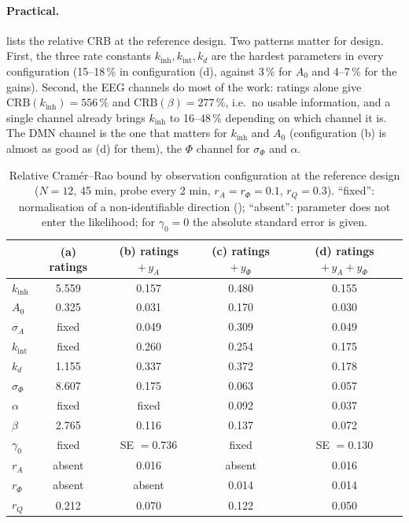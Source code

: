\documentclass[12pt,a4paper]{article}
\theoremstyle{plain}
\theoremstyle{definition}
\theoremstyle{remark}
\newcommand{\kinh}{k_{\mathrm{inh}}}
\newcommand{\kint}{k_{\mathrm{int}}}
\newcommand{\kd}{k_{d}}
\newcommand{\sA}{\sigma_{A}}
\newcommand{\sPhi}{\sigma_{\Phi}}
\newcommand{\rA}{r_{A}}
\newcommand{\rPhi}{r_{\Phi}}
\newcommand{\rQ}{r_{Q}}
\newcommand{\CRB}{\mathrm{CRB}}
\begin{document}
\paragraph{Practical.}  lists the relative CRB at the reference design. Two patterns matter for design. First, the three rate constants $\kinh,\kint,\kd$ are the hardest parameters in every configuration (15--18\,\% in configuration (d), against 3\,\% for $A_0$ and 4--7\,\% for the gains). Second, the EEG channels do most of the work: ratings alone give $\CRB(\kinh)=556\,\%$ and $\CRB(\beta)=277\,\%$, i.e.\ no usable information, and a single channel already brings $\kinh$ to 16--48\,\% depending on which channel it is. The DMN channel is the one that matters for $\kinh$ and $A_0$ (configuration (b) is almost as good as (d) for them), the $\Phi$ channel for $\sPhi$ and $\alpha$.

\begin{table}[t]
\centering\small
\caption{Relative Cram\'er--Rao bound by observation configuration at the reference design ($N=12$, 45 min, probe every 2 min, $\rA=\rPhi=0.1$, $\rQ=0.3$). ``fixed'': normalisation of a non-identifiable direction (); ``absent'': parameter does not enter the likelihood; for $\gamma_0=0$ the absolute standard error is given.}
\label{tab:crb}
\begin{tabular}{lcccc}
\toprule
 & (a) ratings & (b) ratings $+\,y_A$ & (c) ratings $+\,y_\Phi$ & (d) ratings $+\,y_A+y_\Phi$ \\
\midrule
$\kinh$   & 5.559 & 0.157 & 0.480 & 0.155 \\
$A_0$     & 0.325 & 0.031 & 0.170 & 0.030 \\
$\sA$     & fixed & 0.049 & 0.309 & 0.049 \\
$\kint$   & fixed & 0.260 & 0.254 & 0.175 \\
$\kd$     & 1.155 & 0.337 & 0.372 & 0.178 \\
$\sPhi$   & 8.607 & 0.175 & 0.063 & 0.057 \\
$\alpha$  & fixed & fixed & 0.092 & 0.037 \\
$\beta$   & 2.765 & 0.116 & 0.137 & 0.072 \\
$\gamma_0$& fixed & SE $=0.736$ & fixed & SE $=0.130$ \\
$\rA$     & absent & 0.016 & absent & 0.016 \\
$\rPhi$   & absent & absent & 0.014 & 0.014 \\
$\rQ$     & 0.212 & 0.070 & 0.122 & 0.050 \\
\bottomrule
\end{tabular}
\end{table}
\end{document}
